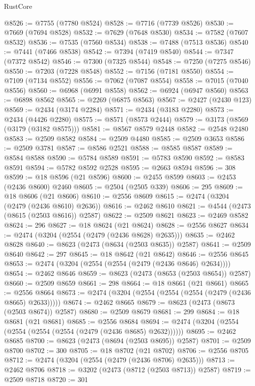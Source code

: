 \begin{lexlean}{RustCore}
\begin{coremodule}
@8526 := @7755 (@7780 @8524)
@8528 := @7716 (@7739 @8526)
@8530 := @7669 (@7694 @8528)
@8532 := @7629 (@7648 @8530)
@8534 := @7582 (@7607 @8532)
@8536 := @7535 (@7560 @8534)
@8538 := @7488 (@7513 @8536)
@8540 := @7441 (@7466 @8538)
@8542 := @7394 (@7419 @8540)
@8544 := @7347 (@7372 @8542)
@8546 := @7300 (@7325 @8544)
@8548 := @7250 (@7275 @8546)
@8550 := @7203 (@7228 @8548)
@8552 := @7156 (@7181 @8550)
@8554 := @7109 (@7134 @8552)
@8556 := @7062 (@7087 @8554)
@8558 := @7015 (@7040 @8556)
@8560 := @6968 (@6991 @8558)
@8562 := @6924 (@6947 @8560)
@8563 := @6898 @8562
@8565 := @2269 (@6875 @8563)
@8567 := @2427 (@2430 @123)
@8569 := @2434 (@3174 @2284)
@8571 := @2434 (@3183 @2280)
@8573 := @2434 (@4426 @2280)
@8575 := @8571 (@8573 @2444)
@8579 := @3173 (@8569 (@3179 (@3182 @8575)))
@8581 := @8567 @8579 @2448
@8582 := @2548 @2480
@8583 := @2509 @8582
@8584 := @2509 @4480
@8585 := @2509 @3653
@8586 := @2509 @3781
@8587 := @8586 @2521
@8588 := @8585 @8587
@8589 := @8584 @8588
@8590 := @5784 @8589
@8591 := @5783 @8590
@8592 := @8583 @8591
@8594 := @5782 @8592 @2528
@8595 := @2663 @8594
@8596 := 308
@8599 := @18 @8596 (@21 @8596)
@8600 := @2455 @8599
@8603 := @2453 (@2436 @8600) @2460
@8605 := @2504 (@2505 @339)
@8606 := 295
@8609 := @18 @8606 (@21 @8606)
@8610 := @2556 @8609
@8615 := @2474 (@3204 (@2479 (@2436 @8610) @2636))
@8616 := @2462 @8610
@8621 := @4544 (@2473 (@8615 (@2503 @8616)) @2587)
@8622 := @2509 @8621
@8623 := @2469 @8582
@8624 := 296
@8627 := @18 @8624 (@21 @8624)
@8628 := @2556 @8627
@8634 := @2474 (@3204 (@2554 (@2479 (@2436 @8628) @2635)))
@8635 := @2462 @8628
@8640 := @8623 (@2473 (@8634 (@2503 @8635)) @2587)
@8641 := @2509 @8640
@8642 := 297
@8645 := @18 @8642 (@21 @8642)
@8646 := @2556 @8645
@8653 := @2474 (@3204 (@2554 (@2554 (@2479 (@2436 @8646) @2634))))
@8654 := @2462 @8646
@8659 := @8623 (@2473 (@8653 (@2503 @8654)) @2587)
@8660 := @2509 @8659
@8661 := 298
@8664 := @18 @8661 (@21 @8661)
@8665 := @2556 @8664
@8673 := @2474 (@3204 (@2554 (@2554 (@2554 (@2479 (@2436 @8665) @2633)))))
@8674 := @2462 @8665
@8679 := @8623 (@2473 (@8673 (@2503 @8674)) @2587)
@8680 := @2509 @8679
@8681 := 299
@8684 := @18 @8681 (@21 @8681)
@8685 := @2556 @8684
@8694 := @2474 (@3204 (@2554 (@2554 (@2554 (@2554 (@2479 (@2436 @8685) @2632))))))
@8695 := @2462 @8685
@8700 := @8623 (@2473 (@8694 (@2503 @8695)) @2587)
@8701 := @2509 @8700
@8702 := 300
@8705 := @18 @8702 (@21 @8702)
@8706 := @2556 @8705
@8712 := @2474 (@3204 (@2554 (@2479 (@2436 @8706) @2635)))
@8713 := @2462 @8706
@8718 := @3202 (@2473 (@8712 (@2503 @8713)) @2587)
@8719 := @2509 @8718
@8720 := 301

\end{coremodule}
\end{lexlean}
